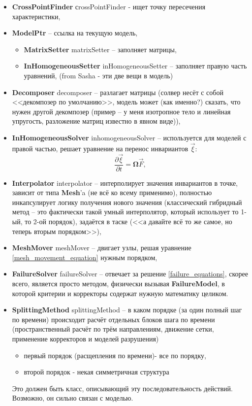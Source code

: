 \documentclass[a4paper,12pt]{article}
\numberwithin{equation}{section}
\begin{document}
	\begin{itemize}
		\item{\textbf{CrossPointFinder} сrossPointFinder - ищет точку пересечения характеристики,}
		\item{\textbf{ModelPtr} -- ссылка на текущую модель,}
		\begin{itemize}
			\item{\textbf{MatrixSetter} matrixSetter -- заполняет матрицы,}
			\item{\textbf{InHomogeneousSetter} inHomogeneousSetter -- заполняет правую часть уравнений,}
			(from Sasha - эти две вещи в модель)
		\end{itemize}
		\item{\textbf{Decomposer} decomposer -- разлагает матрицы (солвер несёт с собой <<декомпозер по умолчанию>>, модель может (как именно?) сказать, что нужен другой декомпозер (пример -- у меня изотропное тело и линейная упругость, разложение матриц известно в явном виде)),}
		\item{\textbf{InHomogeneousSolver} inhomogeneousSolver -- используется для моделей с правой частью, решает уравнение на перенос инвариантов $\vec{\xi}$:}
		\begin{equation}
			\label{invariant_equation}
			\frac{\partial\vec{\xi}}{\partial{t}}=\mathbf{\Omega}\vec{F},
		\end{equation}
		\item{\textbf{Interpolator} interpolator -- интерполирует значения инвариантов в точке, зависит от типа \textbf{Mesh}'a (не всё ко всему применимо), полностью инкапсулирует логику получения нового значения (классический гибридный метод -- это фактически такой умный интерполятор, который использует то 1-ый, то 2-ой порядок), задаётся в таске (<<а давайте всё то же самое, но теперь вторым порядком>>),}
		\item{\textbf{MeshMover} meshMover -- двигает узлы, решая уравнение \eqref{mesh_movement_equation} нужным порядком,}
		\item{\textbf{FailureSolver} failureSolver -- отвечает за решение \eqref{failure_equations}, скорее всего, является просто методом, физически вызывая \textbf{FailureModel}, в которой критерии и корректоры содержат нужную математику целиком.}
		\item{\textbf{SplittingMethod} splittingMethod -- в каком порядке (за один полный шаг по времени) происходит расчёт отдельных блоков шага по времени (пространственный расчёт по трём направлениям, движение сетки, применение корректоров и моделей разрушения)}
		\begin{itemize}
			\item{первый порядок (расщепления по времени)- все по порядку,}
			\item{второй порядок - некая симметричная структура}
		\end{itemize}
		Это должен быть класс, описывающий эту последовательность действий. Возможно, он сильно связан с моделью.
	\end{itemize}
	
\end{document}
